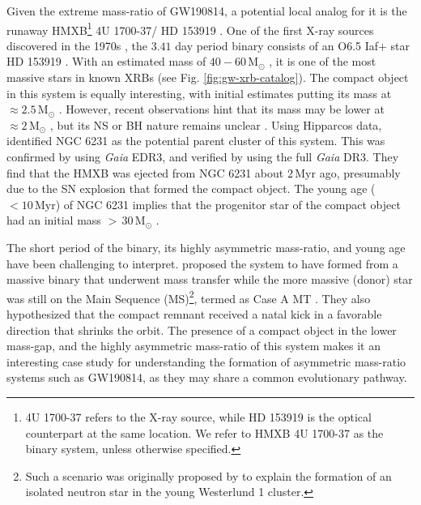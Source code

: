 \documentclass[linenumbers,trackchanges,twocolumn]{aastex701}
\newcommand{\Mdot}{\mathrm{M}_{\odot}}
\newcommand{\Myr}{\mathrm{Myr}}
\begin{document}
Given the extreme mass-ratio of GW190814, a potential local analog for it is the runaway HMXB\footnote{4U 1700-37 refers to the X-ray source, while HD 153919 is the optical counterpart at the same location. We refer to HMXB 4U 1700-37 as the binary system, unless otherwise specified.} 4U 1700-37/ HD 153919 \citep{2015A&A...577A.130F}. One of the first X-ray sources discovered in the 1970s \citep{1973ApJ...181L..43J}, the $3.41$ day period binary consists of an O6.5 Iaf+ star HD 153919 \citep{1973AJ.....78.1067W}. With an estimated mass of $40-60\,\Mdot$ \citep[e.g.,][]{2003A&A...407..685H, 2015A&A...577A.130F}, it is one of the most massive stars in known XRBs (see Fig. \ref{fig:gw-xrb-catalog}). The compact object in this system is equally interesting, with initial estimates putting its mass at $\approx 2.5\,\Mdot$ \citep{2002A&A...392..909C}. However, recent observations hint that its mass may be lower at $\approx 2\,\Mdot$ \citep{2015A&A...577A.130F}, but its NS or BH nature remains unclear \citep[e.g.,][]{2026arXiv260204622W}. Using Hipparcos data, \cite{2001A&A...370..170A} identified NGC 6231 as the potential parent cluster of this system. This was confirmed by \cite{2021A&A...655A..31V} using \emph{Gaia} EDR3, and verified by \cite{2022MNRAS.511.4123H} using the full \emph{Gaia} DR3. They find that the HMXB was ejected from NGC 6231 about $2\,\Myr$ ago, presumably due to the SN explosion that formed the compact object. The young age ($< 10\,\Myr$) of NGC 6231 \citep[e.g.,][]{2007MNRAS.377..945S} implies that the progenitor star of the compact object had an initial mass $>\,30\,\Mdot$ \citep{2001A&A...370..170A}.

The short period of the binary, its highly asymmetric mass-ratio, and young age have been challenging to interpret. \cite{2021A&A...655A..31V} proposed the system to have formed from a massive binary that underwent mass transfer while the more massive (donor) star was still on the Main Sequence (MS)\footnote{Such a scenario was originally proposed by \cite{2008ApJ...685..400B} to explain the formation of an isolated neutron star in the young Westerlund 1 cluster.}, termed as Case A MT \citep{1967ZA.....65..251K}. They also hypothesized that the compact remnant received a natal kick in a favorable direction that shrinks the orbit. The presence of a compact object in the lower mass-gap, and the highly asymmetric mass-ratio of this system makes it an interesting case study for understanding the formation of asymmetric mass-ratio systems such as GW190814, as they may share a common evolutionary pathway.
\end{document}
